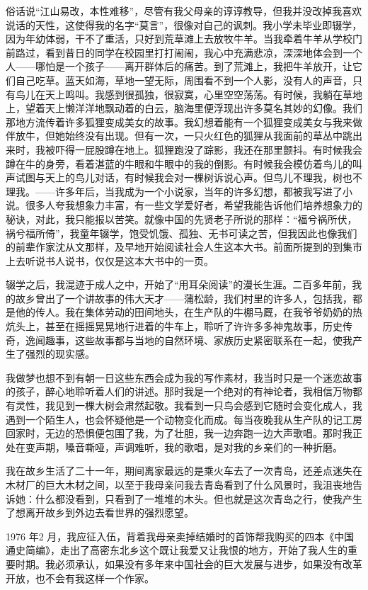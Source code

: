\documentclass[12pt,a5paper]{ctexbook}
\begin{document}
俗话说“江山易改，本性难移”，尽管有我父母亲的谆谆教导，但我并没改掉我喜欢说话的天性，这使得我的名字“莫言”，很像对自己的讽刺。我小学未毕业即辍学，因为年幼体弱，干不了重活，只好到荒草滩上去放牧牛羊。当我牵着牛羊从学校门前路过，看到昔日的同学在校园里打打闹闹，我心中充满悲凉，深深地体会到一个人——哪怕是一个孩子——离开群体后的痛苦。到了荒滩上，我把牛羊放开，让它们自己吃草。蓝天如海，草地一望无际，周围看不到一个人影，没有人的声音，只有鸟儿在天上鸣叫。我感到很孤独，很寂寞，心里空空荡荡。有时候，我躺在草地上，望着天上懒洋洋地飘动着的白云，脑海里便浮现出许多莫名其妙的幻像。我们那地方流传着许多狐狸变成美女的故事。我幻想着能有一个狐狸变成美女与我来做伴放牛，但她始终没有出现。但有一次，一只火红色的狐狸从我面前的草丛中跳出来时，我被吓得一屁股蹲在地上。狐狸跑没了踪影，我还在那里颤抖。有时候我会蹲在牛的身旁，看着湛蓝的牛眼和牛眼中的我的倒影。有时候我会模仿着鸟儿的叫声试图与天上的鸟儿对话，有时候我会对一棵树诉说心声。但鸟儿不理我，树也不理我。——许多年后，当我成为一个小说家，当年的许多幻想，都被我写进了小说。很多人夸我想象力丰富，有一些文学爱好者，希望我能告诉他们培养想象力的秘诀，对此，我只能报以苦笑。就像中国的先贤老子所说的那样：“福兮祸所伏，祸兮福所倚”，我童年辍学，饱受饥饿、孤独、无书可读之苦，但我因此也像我们的前辈作家沈从文那样，及早地开始阅读社会人生这本大书。前面所提到的到集市上去听说书人说书，仅仅是这本大书中的一页。

辍学之后，我混迹于成人之中，开始了“用耳朵阅读”的漫长生涯。二百多年前，我的故乡曾出了一个讲故事的伟大天才——蒲松龄，我们村里的许多人，包括我，都是他的传人。我在集体劳动的田间地头，在生产队的牛棚马厩，在我爷爷奶奶的热炕头上，甚至在摇摇晃晃地行进着的牛车上，聆听了许许多多神鬼故事，历史传奇，逸闻趣事，这些故事都与当地的自然环境、家族历史紧密联系在一起，使我产生了强烈的现实感。

我做梦也想不到有朝一日这些东西会成为我的写作素材，我当时只是一个迷恋故事的孩子，醉心地聆听着人们的讲述。那时我是一个绝对的有神论者，我相信万物都有灵性，我见到一棵大树会肃然起敬。我看到一只鸟会感到它随时会变化成人，我遇到一个陌生人，也会怀疑他是一个动物变化而成。每当夜晚我从生产队的记工房回家时，无边的恐惧便包围了我，为了壮胆，我一边奔跑一边大声歌唱。那时我正处在变声期，嗓音嘶哑，声调难听，我的歌唱，是对我的乡亲们的一种折磨。

我在故乡生活了二十一年，期间离家最远的是乘火车去了一次青岛，还差点迷失在木材厂的巨大木材之间，以至于我母亲问我去青岛看到了什么风景时，我沮丧地告诉她：什么都没看到，只看到了一堆堆的木头。但也就是这次青岛之行，使我产生了想离开故乡到外边去看世界的强烈愿望。

1976 年2 月，我应征入伍，背着我母亲卖掉结婚时的首饰帮我购买的四本《中国通史简编》，走出了高密东北乡这个既让我爱又让我恨的地方，开始了我人生的重要时期。我必须承认，如果没有多年来中国社会的巨大发展与进步，如果没有改革开放，也不会有我这样一个作家。
\end{document}
